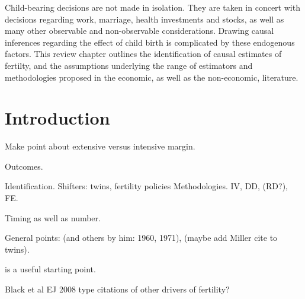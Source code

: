 \begin{chapabstract}
Child-bearing decisions are not made in isolation.  They are taken in concert 
with decisions regarding work, marriage, health investments and stocks, as well 
as many other observable and non-observable considerations.  Drawing causal 
inferences regarding the effect of child birth is complicated by these 
endogenous factors.  This review chapter outlines the identification of causal
estimates of fertilty, and the assumptions underlying the range of estimators
and methodologies proposed in the economic, as well as the non-economic, 
literature.
\end{chapabstract}

\newpage
\section{Introduction}
Make point about extensive versus intensive margin.

Outcomes.

Identification.  Shifters: twins, fertility policies
Methodologies. IV, DD, (RD?), FE.

Timing as well as number.

General points: \citet{Enke1966} (and others by him: 1960, 1971), 
\citet{KearneyLevine2012, Schultz2008, GMiller2009, RosenzweigWolpin1986}
(maybe add Miller cite to twins).

\citet{Moffitt2005} is a useful starting point.

Black et al EJ 2008 type citations of other drivers of fertility?

